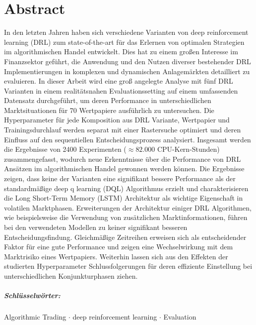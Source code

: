 \chapter*{Abstract}
\label{abstract}

In den letzten Jahren haben sich verschiedene Varianten von deep reinforcement learning (\acs{DRL}) zum state-of-the-art für das Erlernen von optimalen Strategien im algorithmischen Handel entwickelt.
Dies hat zu einem großen Interesse im Finanzsektor geführt, die Anwendung und den Nutzen diverser bestehender \acs{DRL} Implementierungen in komplexen und dynamischen Anlagemärkten detailliert zu evaluieren. 
In dieser Arbeit wird eine groß angelegte Analyse mit fünf \acs{DRL} Varianten in einem realitätsnahen Evaluationssetting auf einem umfassenden Datensatz durchgeführt, um deren Performance in unterschiedlichen Marktsituationen für 70 Wertpapiere ausführlich zu untersuchen.
Die Hyperparameter für jede Komposition aus \acs{DRL} Variante, Wertpapier und Trainingsdurchlauf werden separat mit einer Rastersuche optimiert und deren Einfluss auf den sequentiellen Entscheidungsprozess analysiert.
Insgesamt werden die Ergebnisse von 2400 Experimenten ($\approx 82.000$ CPU-Kern-Stunden) zusammengefasst, wodurch neue Erkenntnisse über die Performance von \acs{DRL} Ansätzen im algorithmischen Handel gewonnen werden können.
Die Ergebnisse zeigen, dass keine der Varianten eine signifikant bessere Performance als der standardmäßige deep q learning (\acs{DQL}) Algorithmus erzielt und charakterisieren die Long Short-Term Memory (\acs{LSTM}) Architektur als wichtige Eigenschaft in volatilen Marktphasen. Erweiterungen der Architektur einiger \acs{DRL} Algorithmen, wie beispielsweise die Verwendung von zusätzlichen Marktinformationen, führen bei den verwendeten Modellen zu keiner signifikant besseren Entscheidungsfindung. 
Gleichmäßige Zeitreihen erweisen sich als entscheidender Faktor für eine gute Performance und zeigen eine Wechselwirkung mit dem Marktrisiko eines Wertpapiers.
Weiterhin lassen sich aus den Effekten der studierten Hyperparameter Schlussfolgerungen für deren effiziente Einstellung bei unterschiedlichen Konjunkturphasen ziehen.
\vspace{0.55cm}

\paragraph{Schlüsselwörter:} Algorithmic Trading $\cdot$ deep reinforcement learning $\cdot$ Evaluation